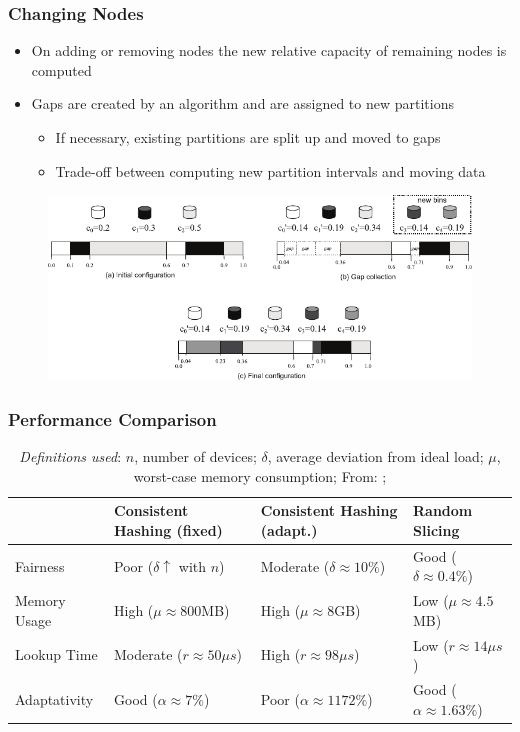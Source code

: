 \documentclass[aspectratio=169]{beamer}
\begin{document}
\begin{frame}
\frametitle{Changing Nodes}
\begin{itemize}
\item On adding or removing nodes the new relative capacity of remaining nodes is computed
\item Gaps are created by an algorithm and are assigned to new partitions
\begin{itemize}
\item If necessary, existing partitions are split up and moved to gaps
\item Trade-off between computing new partition intervals and moving data
\end{itemize}
\end{itemize}
\begin{figure}
\includegraphics[height=0.5\textheight]{rslicing_gap_collection}
\caption{\protect\cite{Miranda2014}}
\end{figure}
\end{frame}

\begin{frame}
\frametitle{Performance Comparison}
\begin{table}
\begin{tabularx}{\textwidth}{|l|X|X|X|}
\hline
 & Consistent Hashing (fixed) & Consistent Hashing (adapt.) & Random Slicing\\\hline\hline
 Fairness & Poor ($\delta\uparrow$ with $n$) & Moderate ($\delta\approx10\%$) & Good ($\delta\approx 0.4\%$)\\\hline
 Memory Usage & High ($\mu\approx800$MB) & High ($\mu\approx8$GB) & Low ($\mu\approx4.5$MB)\\\hline
 Lookup Time & Moderate ($r\approx50\mu s$) & High ($r\approx98\mu s$) & Low ($r\approx14\mu s$)\\\hline
 Adaptativity & Good ($\alpha\approx7\%$) & Poor ($\alpha\approx1172\%$) & Good ($\alpha\approx1.63\%$)\\\hline
\end{tabularx}
\caption{\emph{Definitions used}: $n$, number of devices; $\delta$, average deviation from ideal load; $\mu$, worst-case
memory consumption; From: \protect\cite{Miranda2014};}
\end{table}
\end{frame}
\end{document}
